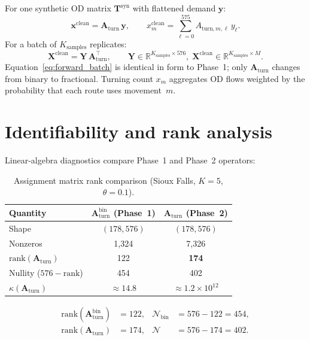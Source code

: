 \documentclass[11pt,a4paper]{report}
\newcommand{\Tsyn}{\mathbf{T}^{\mathrm{syn}}}
\newcommand{\mathbfy}{\mathbf{y}}
\newcommand{\mathbfx}{\mathbf{x}}
\newcommand{\mathbfX}{\mathbf{X}}
\newcommand{\mathbfY}{\mathbf{Y}}
\newcommand{\Aturn}{\mathbf{A}_{\mathrm{turn}}}
\begin{document}
For one synthetic OD matrix $\Tsyn$ with flattened demand $\mathbfy$:
\begin{equation}
    \mathbfx^{\mathrm{clean}} = \Aturn\,\mathbfy,
    \qquad
    x^{\mathrm{clean}}_m = \sum_{\ell=0}^{575} A_{\mathrm{turn},m,\ell}\, y_\ell.
    \label{eq:forward_single}
\end{equation}
For a batch of $K_{\mathrm{samples}}$ replicates:
\begin{equation}
    \mathbfX^{\mathrm{clean}} = \mathbfY\,\Aturn^\top,
    \qquad
    \mathbfY\in\mathbb{R}^{K_{\mathrm{samples}}\times 576},\;
    \mathbfX^{\mathrm{clean}}\in\mathbb{R}^{K_{\mathrm{samples}}\times M}.
    \label{eq:forward_batch}
\end{equation}
Equation~\eqref{eq:forward_batch} is identical in form to Phase~1; only $\Aturn$ changes from binary to fractional. Turning count $x_m$ aggregates OD flows weighted by the probability that each route uses movement~$m$.

\section{Identifiability and rank analysis}

Linear-algebra diagnostics compare Phase~1 and Phase~2 operators:

\begin{table}[ht]
\centering
\caption{Assignment matrix rank comparison (Sioux Falls, $K=5$, $\theta=0.1$).}
\label{tab:rank_compare}
\begin{tabular}{@{}lcc@{}}
\toprule
\textbf{Quantity} & $\Aturn^{\mathrm{bin}}$ (Phase~1) & $\Aturn$ (Phase~2) \\
\midrule
Shape & $(178,576)$ & $(178,576)$ \\
Nonzeros & 1{,}324 & 7{,}326 \\
$\mathrm{rank}(\Aturn)$ & 122 & \textbf{174} \\
Nullity ($576-\mathrm{rank}$) & 454 & 402 \\
$\kappa(\Aturn)$ & $\approx 14.8$ & $\approx 1.2\times 10^{12}$ \\
\bottomrule
\end{tabular}
\end{table}

\begin{align}
    \mathrm{rank}(\Aturn^{\mathrm{bin}}) &= 122, &
    \mathcal{N}_{\mathrm{bin}} &= 576-122 = 454, \label{eq:rank_bin}\\
    \mathrm{rank}(\Aturn) &= 174, &
    \mathcal{N} &= 576-174 = 402. \label{eq:rank_prob}
\end{align}
\end{document}
